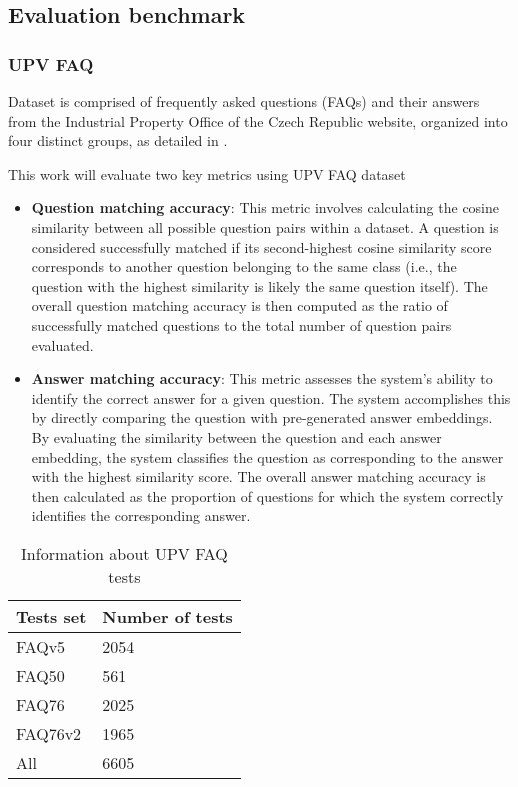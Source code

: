 \subsection{Evaluation  benchmark}

\subsubsection{UPV FAQ}

Dataset is comprised of frequently asked questions (FAQs) and their answers from the Industrial Property Office of the Czech Republic website, organized into four distinct groups, as detailed in .

This work will evaluate two key metrics using UPV FAQ dataset
\begin{itemize}
  \item \textbf{Question matching accuracy}: This metric involves calculating the cosine similarity between all possible question pairs within a dataset.
                                            A question is considered successfully matched if its second-highest cosine similarity score corresponds to another question belonging to the same class (i.e., the question with the highest similarity is likely the same question itself). 
                                            The overall question matching accuracy is then computed as the ratio of successfully matched questions to the total number of question pairs evaluated.  
  \item \textbf{Answer matching accuracy}: This metric assesses the system's ability to identify the correct answer for a given question.
                                            The system accomplishes this by directly comparing the question with pre-generated answer embeddings.
                                            By evaluating the similarity between the question and each answer embedding, the system classifies the question as corresponding to the answer with the highest similarity score.
                                            The overall answer matching accuracy is then calculated as the proportion of questions for which the system correctly identifies the corresponding answer.  
\end{itemize}

\begin{table}[!ht]
  \centering
  \begin{tabular}{ |p{2cm}||p{3cm}| }
    \hline
    Tests set & Number of tests \\
    \hline
    FAQv5     & 2054            \\
    FAQ50     & 561             \\
    FAQ76     & 2025            \\
    FAQ76v2   & 1965            \\
    \hline
    \hline
    All       & 6605            \\
    \hline
  \end{tabular}
  \caption{Information about UPV FAQ tests} \label{table:UPV_FAQ_info}
\end{table}


